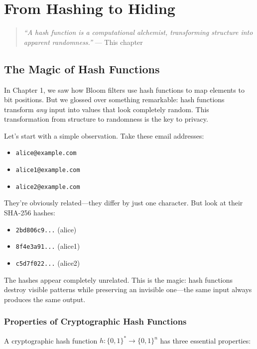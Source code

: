 \chapter{From Hashing to Hiding}
\label{ch:hashing}

\begin{quote}
\emph{``A hash function is a computational alchemist, transforming structure into apparent randomness.''} — This chapter
\end{quote}

\section{The Magic of Hash Functions}

In Chapter 1, we saw how Bloom filters use hash functions to map elements to bit positions. But we glossed over something remarkable: hash functions transform \emph{any} input into values that look completely random. This transformation from structure to randomness is the key to privacy.

Let's start with a simple observation. Take these email addresses:
\begin{itemize}
    \item \texttt{alice@example.com}
    \item \texttt{alice1@example.com}
    \item \texttt{alice2@example.com}
\end{itemize}

They're obviously related—they differ by just one character. But look at their SHA-256 hashes:
\begin{itemize}
    \item \texttt{2bd806c9...} (alice)
    \item \texttt{8f4e3a91...} (alice1)
    \item \texttt{c5d7f022...} (alice2)
\end{itemize}

The hashes appear completely unrelated. This is the magic: hash functions destroy visible patterns while preserving an invisible one—the same input always produces the same output.

\subsection{Properties of Cryptographic Hash Functions}

A cryptographic hash function $h: \{0,1\}^* \to \{0,1\}^n$ has three essential properties:

